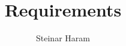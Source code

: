 \documentclass[a4paper,12pt]{article}
\title{Requirements}
\author{Steinar Haram}
\begin{document}
%

\tableofcontents
\listoftables
\listoffigures




\pagebreak


%
%
%

%			
%
\end{document}
